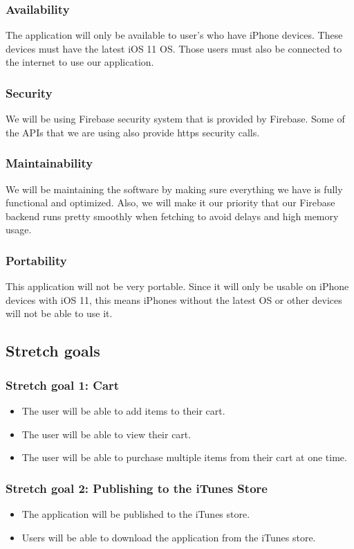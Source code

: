 \documentclass[onecolumn, draftclsnofoot,10pt, compsoc]{IEEEtran}
\begin{document}
\subsubsection{Availability}
The application will only be available to user's who have iPhone devices. These devices must have the latest iOS 11 OS. Those users must also be connected to the internet to use our application.

\subsubsection{Security}
We will be using Firebase security system that is provided by Firebase. Some of the APIs that we are using also provide https security calls.

\subsubsection{Maintainability}
We will be maintaining the software by making sure everything we have is fully functional and optimized. Also, we will make it our priority that our Firebase backend runs pretty smoothly when fetching to avoid delays and high memory usage.

\subsubsection{Portability}
This application will not be very portable. Since it will only be usable on iPhone devices with iOS 11, this means iPhones without the latest OS or other devices will not be able to use it.

\subsection{Stretch goals}

\subsubsection{Stretch goal 1: Cart}
\begin{itemize}
\item The user will be able to add items to their cart.
\item The user will be able to view their cart.
\item The user will be able to purchase multiple items from their cart at one time.
\end{itemize}

\subsubsection{Stretch goal 2: Publishing to the iTunes Store}
\begin{itemize}
\item The application will be published to the iTunes store.
\item Users will be able to download the application from the iTunes store.
\end{itemize}
\end{document}
